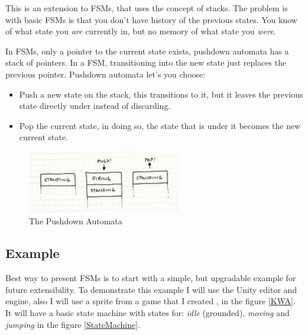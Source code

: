 \documentclass[a4paper, 12pt]{book}
\begin{document}
This is an extension to FSMs, that uses the concept of stacks. The problem is with basic FSMs is that you don't have history of the previous states. You know of what state you \emph{are} currently in, but no memory of what state you \emph{were}.

In FSMs, only a pointer to the current state exists, pushdown automata has a stack of pointers. In a FSM, transitioning into the new state just replaces the previous pointer. Pushdown automata let's you choose:
\begin{itemize}
    \item Push a new state on the stack, this transitions to it, but it leaves the previous state directly under instead of discarding.
    \item Pop the current state, in doing so, the state that is under it becomes the new current state.
\end{itemize}

\begin{figure}[h]
\begin{center}
\includegraphics[width=0.6\textwidth]{Images/state_pushdown.png}
\end{center}
\caption{The Pushdown Automata \cite{GameProgrammingPattersFMS}}
\label{pic2}
\end{figure}

\subsection{Example}

Best way to present FSMs is to start with a simple, but upgradable example for future extensibility. To demonstrate this example I will use the Unity \cite{UnitySoftware} editor and engine, also I will use a sprite from a game that I created \cite{KWA}, in the figure \ref{KWA}. It will have a basic state machine with states for: \emph{idle} (grounded), \emph{moving} and \emph{jumping} in the figure \ref{StateMachine}.
\end{document}
